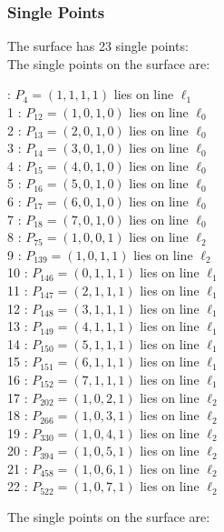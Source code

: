 \documentclass{article}
\begin{document}
{\subsubsection*{Single Points}
The surface has 23 single points:\\
The single points on the surface are:\\
\begin{multicols}{2}
 : $P_{4}=( 1, 1, 1, 1 )$ lies on line $\ell_{1}$\\
1 : $P_{12}=( 1, 0, 1, 0 )$ lies on line $\ell_{0}$\\
2 : $P_{13}=( 2, 0, 1, 0 )$ lies on line $\ell_{0}$\\
3 : $P_{14}=( 3, 0, 1, 0 )$ lies on line $\ell_{0}$\\
4 : $P_{15}=( 4, 0, 1, 0 )$ lies on line $\ell_{0}$\\
5 : $P_{16}=( 5, 0, 1, 0 )$ lies on line $\ell_{0}$\\
6 : $P_{17}=( 6, 0, 1, 0 )$ lies on line $\ell_{0}$\\
7 : $P_{18}=( 7, 0, 1, 0 )$ lies on line $\ell_{0}$\\
8 : $P_{75}=( 1, 0, 0, 1 )$ lies on line $\ell_{2}$\\
9 : $P_{139}=( 1, 0, 1, 1 )$ lies on line $\ell_{2}$\\
10 : $P_{146}=( 0, 1, 1, 1 )$ lies on line $\ell_{1}$\\
11 : $P_{147}=( 2, 1, 1, 1 )$ lies on line $\ell_{1}$\\
12 : $P_{148}=( 3, 1, 1, 1 )$ lies on line $\ell_{1}$\\
13 : $P_{149}=( 4, 1, 1, 1 )$ lies on line $\ell_{1}$\\
14 : $P_{150}=( 5, 1, 1, 1 )$ lies on line $\ell_{1}$\\
15 : $P_{151}=( 6, 1, 1, 1 )$ lies on line $\ell_{1}$\\
16 : $P_{152}=( 7, 1, 1, 1 )$ lies on line $\ell_{1}$\\
17 : $P_{202}=( 1, 0, 2, 1 )$ lies on line $\ell_{2}$\\
18 : $P_{266}=( 1, 0, 3, 1 )$ lies on line $\ell_{2}$\\
19 : $P_{330}=( 1, 0, 4, 1 )$ lies on line $\ell_{2}$\\
20 : $P_{394}=( 1, 0, 5, 1 )$ lies on line $\ell_{2}$\\
21 : $P_{458}=( 1, 0, 6, 1 )$ lies on line $\ell_{2}$\\
22 : $P_{522}=( 1, 0, 7, 1 )$ lies on line $\ell_{2}$\\
\end{multicols}
The single points on the surface are:\\
}
\end{document}
